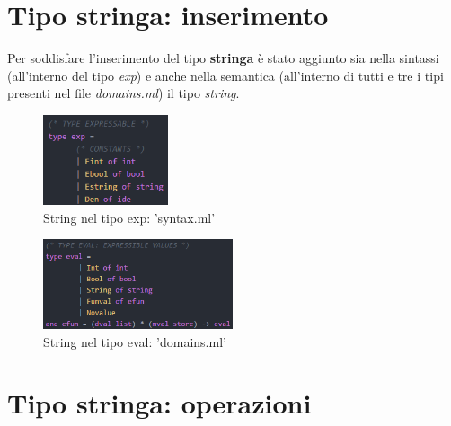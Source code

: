 \documentclass[a4paper,titlepage]{book}
\begin{document}
\section{Tipo stringa: inserimento}
Per soddisfare l'inserimento del tipo \textbf{stringa} \`e stato aggiunto sia nella sintassi (all'interno del tipo \textit{exp}) e anche
nella semantica (all'interno di tutti e tre i tipi presenti nel file \textit{domains.ml}) il tipo \textit{string}.

\begin{figure}[H]
\center
\includegraphics[height=100px]{img/type_exp.png}
\caption{String nel tipo exp: 'syntax.ml' \label{fig:type_exp}}
\end{figure}

\begin{figure}[H]
\center
\includegraphics[height=100px]{img/type_eval.png}
\caption{String nel tipo eval: 'domains.ml' \label{fig:type_eval}}
\end{figure}

\clearpage
\section{Tipo stringa: operazioni}
\end{document}
